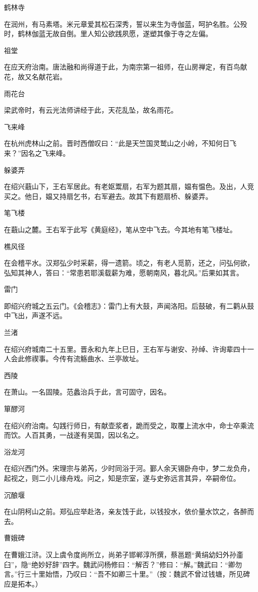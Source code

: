 \documentclass[a4paper,12pt,UTF8,twoside]{ctexbook}
\begin{document}
	鹤林寺
	
	在润州，有马素塔。米元章爱其松石深秀，誓以来生为寺伽蓝，呵护名胜。公殁时，鹤林伽蓝无故自倒。里人知公欲践夙愿，遂塑其像于寺之左偏。
	
	祖堂
	
	在应天府治南。唐法融和尚得道于此，为南宗第一祖师，在山房禅定，有百鸟献花，故又名献花岩。
	
	雨花台
	
	梁武帝时，有云光法师讲经于此，天花乱坠，故名雨花。
	
	飞来峰
	
	在杭州虎林山之前。晋时西僧叹曰：“此是天竺国灵鹫山之小岭，不知何日飞来？”因名之飞来峰。
	
	躲婆弄
	
	在绍兴蕺山下，王右军居此。有老妪鬻扇，右军为题其扇，媪有愠色。及出，人竞买之。他日，媪又持扇乞书，右军避去。故其下有题扇桥、躲婆弄。
	
	笔飞楼
	
	在蕺山之麓。王右军于此写《黄庭经》，笔从空中飞去。今其地有笔飞楼址。
	
	樵风径
	
	在会稽平水。汉郑弘少时采薪，得一遗箭。顷之，有老人觅箭，还之，问弘何欲，弘知其神人，答曰：“常患若耶溪载薪为难，愿朝南风，暮北风。”后果如其言。
	
	雷门
	
	即绍兴府城之五云门。《会稽志》：雷门上有大鼓，声闻洛阳。后鼓破，有二鹳从鼓中飞出，声遂不远。
	
	兰渚
	
	在绍兴府城南二十五里。晋永和九年上巳日，王右军与谢安、孙绰、许询辈四十一人会此修禊事。今传有流觞曲水、兰亭故址。
	
	西陵
	
	在萧山。一名固陵。范蠡治兵于此，言可固守，因名。
	
	箪醪河
	
	在绍兴府治南。勾践行师日，有献壶浆者，跪而受之，取覆上流水中，命士卒乘流而饮。人百其勇，一战遂有吴国，因以名之。
	
	浴龙河
	
	在绍兴西门外。宋理宗与弟芮，少时同浴于河。鄞人余天锡卧舟中，梦二龙负舟，起视之，则二小儿缘舟戏。问之，知是宗室，遂与史弥远言其异，卒嗣帝位。
	
	沉酿堰
	
	在山阴柯山之前。郑弘应举赴洛，亲友饯于此，以钱投水，依价量水饮之，各醉而去。
	
	曹娥碑
	
	在曹娥江浒。汉上虞令度尚所立，尚弟子邯郸淳所撰，蔡邕题“黄绢幼妇外孙齑臼”，隐“绝妙好辞”四字。魏武问杨修曰：“解否？”修曰：“解。”魏武曰：“卿勿言。”行三十里始悟，乃叹曰：“吾不如卿三十里。”（按：魏武不曾过钱塘，所见碑应是拓本。）
	
\end{document}
